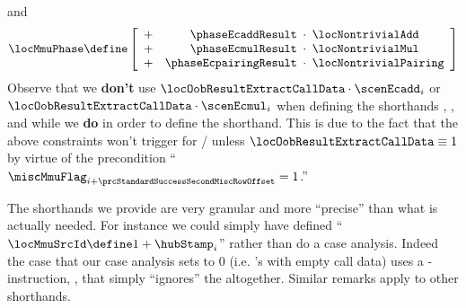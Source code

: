 \begin{description}
\begin{description}
				and
				\[
					\locMmuPhase \define
					\left[ \begin{array}{crclcl}
						+ & \phaseEcaddResult     & \!\!\!\cdot\!\!\! & \locNontrivialAdd     \\
						+ & \phaseEcmulResult     & \!\!\!\cdot\!\!\! & \locNontrivialMul     \\
						+ & \phaseEcpairingResult & \!\!\!\cdot\!\!\! & \locNontrivialPairing \\
					\end{array} \right]
				\]
				\saNote{} Observe that we \textbf{don't} use
				$\locOobResultExtractCallData \cdot \scenEcadd _{i}$ or
				$\locOobResultExtractCallData \cdot \scenEcmul _{i}$
				when defining the shorthands 
				\locMmuInst{},
				\locMmuSize{},
				\locMmuExoSum{} and
				\locMmuPhase{} while we \textbf{do} in order to define the \locTriggerMmu{} shorthand.
				This is due to the fact that the above constraints won't trigger for \instEcadd{} / \instEcmul{} unless $\locOobResultExtractCallData \equiv 1$ by virtue of the precondition
				``\If $\miscMmuFlag_{i + \prcStandardSuccessSecondMiscRowOffset} = 1$.''

				\saNote{} The shorthands we provide are very granular and more ``precise'' than what is actually needed.
				For instance we could simply have defined ``$\locMmuSrcId \define 1 + \hubStamp_{i}$'' rather than do a case analysis.
				Indeed the case that our case analysis sets to $0$ (i.e. \instEcpairing{}'s with empty call data) uses a \mmuMod{}-instruction, \mmuInstMstore{}, that simply ``ignores'' the \miscMmuSrcId{} altogether. Similar remarks apply to other shorthands.


\end{description}
\end{description}

